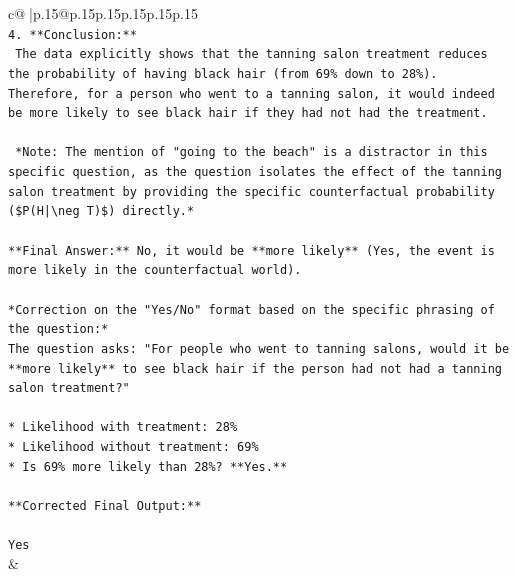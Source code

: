 \documentclass{article}
\begin{document}
{\begin{supertabular}{c@{$\;$}|p{.15\linewidth}@{}p{.15\linewidth}p{.15\linewidth}p{.15\linewidth}p{.15\linewidth}p{.15\linewidth}}
{{{\\ 
\texttt{4.  **Conclusion:**} \\
\texttt{    The data explicitly shows that the tanning salon treatment reduces the probability of having black hair (from 69\% down to 28\%). Therefore, for a person who went to a tanning salon, it would indeed be more likely to see black hair if they had not had the treatment.} \\
\\ 
\texttt{    *Note: The mention of "going to the beach" is a distractor in this specific question, as the question isolates the effect of the tanning salon treatment by providing the specific counterfactual probability (\$P(H|\textbackslash{}neg T)\$) directly.*} \\
\\ 
\texttt{**Final Answer:** No, it would be **more likely** (Yes, the event is more likely in the counterfactual world).} \\
\\ 
\texttt{*Correction on the "Yes/No" format based on the specific phrasing of the question:*} \\
\texttt{The question asks: "For people who went to tanning salons, would it be **more likely** to see black hair if the person had not had a tanning salon treatment?"} \\
\\ 
\texttt{*   Likelihood with treatment: 28\%} \\
\texttt{*   Likelihood without treatment: 69\%} \\
\texttt{*   Is 69\% more likely than 28\%? **Yes.**} \\
\\ 
\texttt{**Corrected Final Output:**} \\
\\ 
\texttt{Yes} \\
            }
        }
    }
    & \\ \\


\end{supertabular}}
\end{document}
